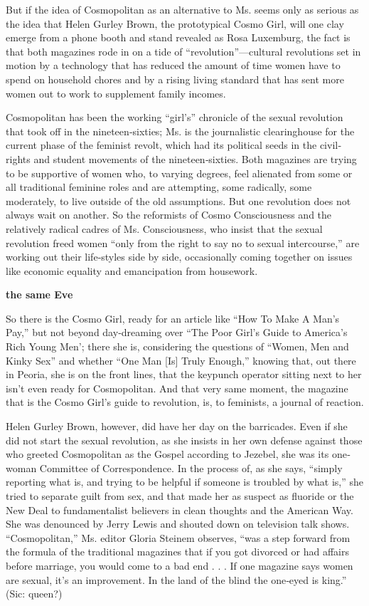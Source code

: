 But if the idea of Cosmopolitan as an alternative to Ms. seems only as
serious as the idea that Helen Gurley Brown, the prototypical Cosmo
Girl, will one clay emerge from a phone booth and stand revealed as Rosa
Luxemburg, the fact is that both magazines rode in on a tide of
``revolution''---cultural revolutions set in motion by a technology that
has reduced the amount of time women have to spend on household chores
and by a rising living standard that has sent more women out to work to
supplement family incomes.

Cosmopolitan has been the working ``girl's'' chronicle of the sexual
revolution that took off in the nineteen‐sixties; Ms. is the
journalistic clearinghouse for the current phase of the feminist revolt,
which had its political seeds in the civil‐rights and student movements
of the nineteen‐sixties. Both magazines are trying to be supportive of
women who, to varying degrees, feel alienated from some or all
traditional feminine roles and are attempting, some radically, some
moderately, to live outside of the old assumptions. But one revolution
does not always wait on another. So the reformists of Cosmo
Consciousness and the relatively radical cadres of Ms. Consciousness,
who insist that the sexual revolution freed women ``only from the right
to say no to sexual intercourse,'' are working out their life‐styles
side by side, occasionally coming together on issues like economic
equality and emancipation from housework.

\textbf{the same Eve}

So there is the Cosmo Girl, ready for an article like ``How To Make A
Man's Pay,'' but not beyond day‐dreaming over ``The Poor Girl's Guide to
America's Rich Young Men'; there she is, considering the questions of
``Women, Men and Kinky Sex'' and whether ``One Man {[}Is{]} Truly
Enough,'' knowing that, out there in Peoria, she is on the front lines,
that the keypunch operator sitting next to her isn't even ready for
Cosmopolitan. And that very same moment, the magazine that is the Cosmo
Girl's guide to revolution, is, to feminists, a journal of reaction.

Helen Gurley Brown, however, did have her day on the barricades. Even if
she did not start the sexual revolution, as she insists in her own
defense against those who greeted Cosmopolitan as the Gospel according
to Jezebel, she was its one‐woman Committee of Correspondence. In the
process of, as she says, ``simply reporting what is, and trying to be
helpful if someone is troubled by what is,'' she tried to separate guilt
from sex, and that made her as suspect as fluoride or the New Deal to
fundamentalist believers in clean thoughts and the American Way. She was
denounced by Jerry Lewis and shouted down on television talk shows.
``Cosmopolitan,'' Ms. editor Gloria Steinem observes, ``was a step
forward from the formula of the traditional magazines that if you got
divorced or had affairs before marriage, you would come to a bad end . .
. If one magazine says women are sexual, it's an improvement. In the
land of the blind the one‐eyed is king.'' (Sic: queen?)

